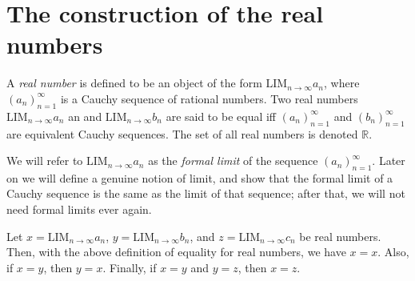 \section{The construction of the real numbers}

\begin{definition}\label{5.3.1}
A \emph{real number} is defined to be an object of the form \(\text{LIM}_{n \to \infty} a_n\), where \((a_n)_{n = 1}^{\infty}\) is a Cauchy sequence of rational numbers.
Two real numbers \(\text{LIM}_{n \to \infty} a_n\) an and \(\text{LIM}_{n \to \infty} b_n\) are said to be equal iff \((a_n)_{n = 1}^{\infty}\) and \((b_n)_{n = 1}^{\infty}\) are equivalent Cauchy sequences.
The set of all real numbers is denoted \(\mathds{R}\).
\end{definition}

\begin{note}
We will refer to \(\text{LIM}_{n \to \infty} a_n\) as the \emph{formal limit} of the sequence \((a_n)_{n = 1}^{\infty}\).
Later on we will define a genuine notion of limit, and show that the formal limit of a Cauchy sequence is the same as the limit of that sequence;
after that, we will not need formal limits ever again.
\end{note}

\setcounter{theorem}{2}
\begin{proposition}\label{5.3.3}
Let \(x = \text{LIM}_{n \to \infty} a_n\), \(y = \text{LIM}_{n \to \infty} b_n\), and \(z = \text{LIM}_{n \to \infty} c_n\) be real numbers.
Then, with the above definition of equality for real numbers, we have \(x = x\).
Also, if \(x = y\), then \(y = x\).
Finally, if \(x = y\) and \(y = z\), then \(x = z\).
\end{proposition}

